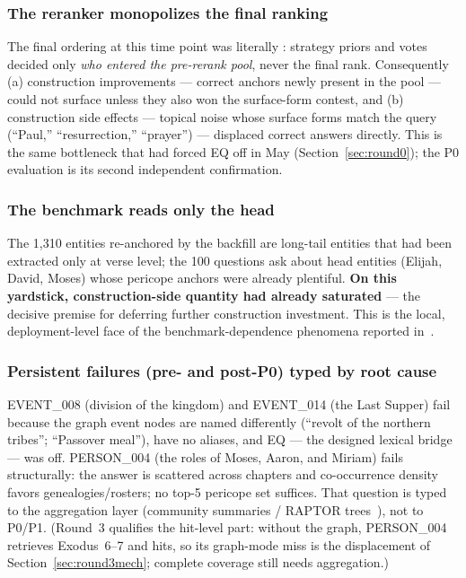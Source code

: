 \subsubsection{The reranker monopolizes the final ranking}
The final ordering at this time point was literally
: strategy priors and votes
decided only \emph{who entered the pre-rerank pool}, never the final
rank. Consequently (a) construction improvements --- correct anchors
newly present in the pool --- could not surface unless they also won the
surface-form contest, and (b) construction side effects --- topical
noise whose surface forms match the query (``Paul,''
``resurrection,'' ``prayer'') --- displaced correct answers directly.
This is the same bottleneck that had forced EQ off in May
(Section~\ref{sec:round0}); the P0 evaluation is its second independent
confirmation.

\subsubsection{The benchmark reads only the head}
The 1{,}310 entities re-anchored by the backfill are long-tail entities
that had been extracted only at verse level; the 100 questions ask about
head entities (Elijah, David, Moses) whose pericope anchors were already
plentiful. \textbf{On this yardstick, construction-side quantity had
already saturated} --- the decisive premise for deferring further
construction investment. This is the local, deployment-level face of the
benchmark-dependence phenomena reported
in~\cite{zhou2025brink,zeng2025unbiased,xiang2025whengraphs}.

\subsubsection{Persistent failures (pre- and post-P0) typed by root
cause} EVENT\_008 (division of the kingdom) and EVENT\_014 (the Last
Supper) fail because the graph event nodes are named differently
(``revolt of the northern tribes''; ``Passover meal''), have no aliases,
and EQ --- the designed lexical bridge --- was off. PERSON\_004 (the
roles of Moses, Aaron, and Miriam) fails structurally: the answer is
scattered across chapters and co-occurrence density favors
genealogies/rosters; no top-5 pericope set suffices. That question is
typed to the aggregation layer (community summaries / RAPTOR
trees~\cite{sarthi2024raptor,edge2024graphrag}), not to P0/P1. (Round~3
qualifies the hit-level part: without the graph, PERSON\_004 retrieves
Exodus~6--7 and hits, so its graph-mode miss is the displacement of
Section~\ref{sec:round3mech}; complete coverage still needs
aggregation.)


